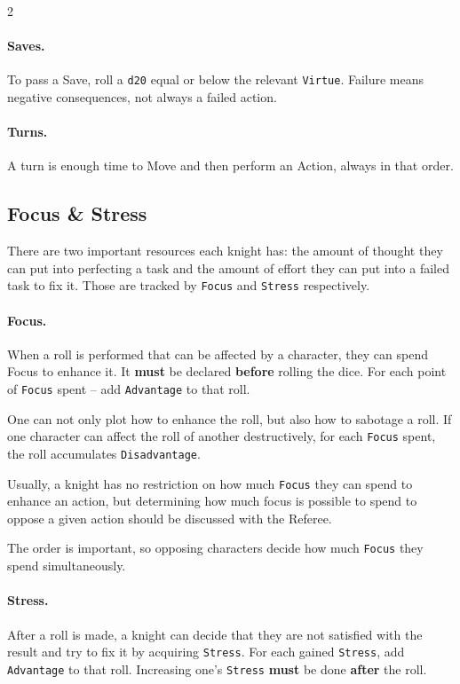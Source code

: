 \documentclass{osr-template/zine}
\begin{document}
\begin{multicols*}{2}

\paragraph{Saves.}

To pass a Save, roll a \texttt{d20} equal or below the
relevant \texttt{Virtue}. Failure means negative
consequences, not always a failed action.

\paragraph{Turns.} A turn is enough time to Move and then
perform an Action, always in that order.

\subsection*{Focus \& Stress}

There are two important resources each knight has:
the amount of thought they can put into perfecting a task and the amount of effort they can put into a failed task to fix it.
Those are tracked by \texttt{Focus} and \texttt{Stress} respectively.

\paragraph{Focus.} When a roll is performed that can be affected by a character, they can spend Focus to
enhance it. It \textbf{must} be declared \textbf{before} rolling the dice. For each point of \texttt{Focus} spent -- add \texttt{Advantage} to that roll.

One can not only plot how to enhance the roll, but also how to sabotage a roll.
If one character can affect the roll of another destructively, for each \texttt{Focus} spent, the roll accumulates \texttt{Disadvantage}.

Usually, a knight has no restriction on how much \texttt{Focus} they can spend to enhance an action, but
determining how much focus is possible to spend to oppose a given action should be discussed with the Referee.

The order is important, so opposing characters decide how much \texttt{Focus} they spend simultaneously.

\paragraph{Stress.} After a roll is made, a knight can decide that they are not satisfied with the result and try to fix it by acquiring \texttt{Stress}.
For each gained \texttt{Stress}, add \texttt{Advantage} to that roll. Increasing one's \texttt{Stress} \textbf{must} be done \textbf{after} the roll.


\end{multicols*}
\end{document}
